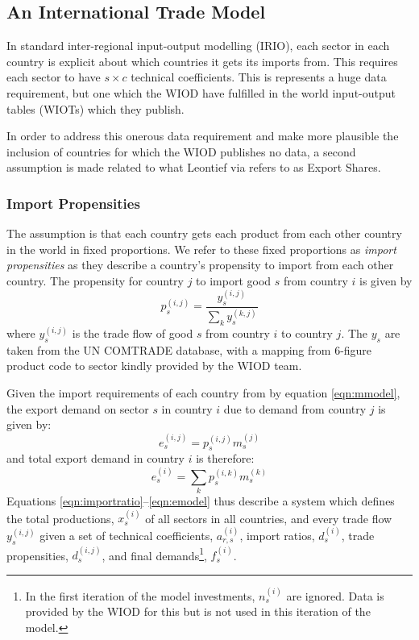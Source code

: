 \documentclass[a4paper]{article}
\begin{document}
\subsection{An International Trade Model}\label{sec:trade}
In standard inter-regional input-output modelling (IRIO), each sector in each country is explicit about which countries it gets its imports from. 
This requires each sector to have $s \times c$ technical coefficients.
This is represents a huge data requirement, but one which the WIOD have fulfilled in the world input-output tables (WIOTs) which they publish.

In order to address this onerous data requirement and make more plausible the inclusion of countries for which the WIOD publishes no data, a second assumption is made related to what Leontief via \textcite{Duchin2004} refers to as Export Shares.

\subsubsection*{Import Propensities}
The assumption is that each country gets each product from each other country in the world in fixed proportions.
We refer to these fixed proportions as \textit{import propensities} as they describe a country's propensity to import from each other country. The propensity for country $j$ to import good $s$ from country $i$ is given by
\begin{equation}
p^{(i,j)}_s = \frac{y^{(i,j)}_s}{\sum_k{y^{(k,j)}_s}}
\end{equation}
where $y^{(i,j)}_s$ is the trade flow of good $s$ from country $i$ to country $j$. The $y_s$ are taken from the UN COMTRADE database, with a mapping from 6-figure product code to sector kindly provided by the WIOD team.

Given the import requirements of each country from by equation \eqref{eqn:mmodel}, the export demand on sector $s$ in country $i$ due to demand from country $j$ is given by:
\begin{equation*}
e_s^{(i,j)} = p_s^{(i,j)}m_s^{(j)}
\end{equation*}
and total export demand in country $i$ is therefore:
\begin{equation}\label{eqn:emodel}
e_s^{(i)} = \sum_k{p_s^{(i,k)}m_s^{(k)}}
\end{equation}
\noindent Equations \eqref{eqn:importratio}--\eqref{eqn:emodel} thus describe a system which defines the total productions, $x_s^{(i)}$ of all sectors in all countries, and every trade flow $y_s^{(i,j)}$ given a set of technical coefficients, $a_{r,s}^{(i)}$, import ratios, $d_s^{(i)}$, trade propensities, $d_s^{(i,j)}$, and final demands\footnote{In the first iteration of the model investments, $n_s^{(i)}$ are ignored. Data is provided by the WIOD for this but is not used in this iteration of the model.}, $f_s^{(i)}$.
\end{document}
